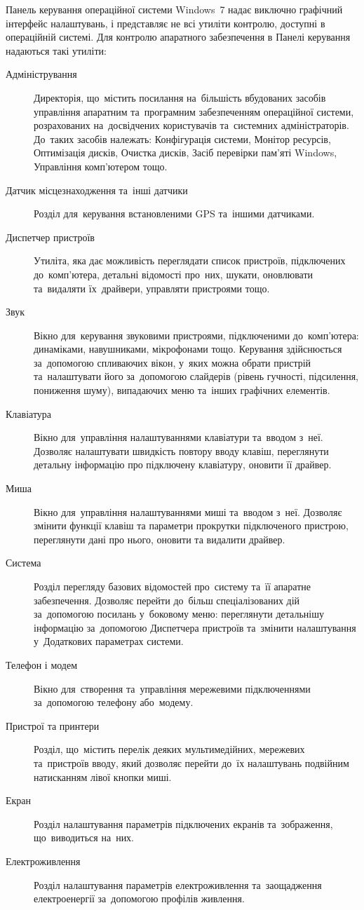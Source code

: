 \documentclass[
	a4paper,
	oneside,
	DIV = 12,
	BCOR = 10mm,
	12pt,
	headings = normal,
]{scrartcl}
\newcommand{\allcaps}[1]{{\addfontfeatures{LetterSpace = 5}#1}}
\begin{document}
			Панель керування операційної системи Windows~7 надає виключно графічний інтерфейс налаштувань, і представляє не всі утиліти контролю, доступні в операційній системі. Для контролю апаратного забезпечення в Панелі керування надаються такі утиліти:
			\begin{description}
				\item [Адміністрування] Директорія, що~містить посилання на~більшість вбудованих засобів управління апаратним та~програмним забезпеченням операційної системи, розрахованих на~досвідчених користувачів та~системних адміністраторів. До~таких засобів належать: Конфігурація системи, Монітор ресурсів, Оптимізація дисків, Очистка дисків, Засіб перевірки пам'\-я\-ті Windows, Управління комп'\-ю\-те\-ром тощо.
				\item [Датчик місцезнаходження та~інші датчики] Розділ для~керування встановленими \allcaps{GPS} та~іншими датчиками.
				\item [Диспетчер пристроїв] Утиліта, яка дає можливість переглядати список пристроїв, підключених до~ком\-п'\-ю\-те\-ра, детальні відомості про~них, шукати, оновлювати та~видаляти їх~драйвери, управляти пристроями тощо.
				\item [Звук] Вікно для~керування звуковими пристроями, підключеними до~ком\-п'\-ю\-те\-ра: динаміками, навушниками, мікрофонами тощо. Керування здійснюється за~допомогою спливаючих вікон, у~яких можна обрати пристрій та~налаштувати його за~допомогою слайдерів (рівень гучності, підсилення, пониження шуму), випадаючих меню та~інших графічних елементів.
				\item [Клавіатура] Вікно для~управління налаштуваннями клавіатури та~вводом з~неї. Дозволяє налаштувати швидкість повтору вводу клавіш, переглянути детальну інформацію про підключену клавіатуру, оновити її драйвер.
				\item [Миша] Вікно для~управління налаштуваннями миші та~вводом з~неї. Дозволяє змінити функції клавіш та параметри прокрутки підключеного пристрою, переглянути дані про нього, оновити та видалити драйвер.
				\item [Система] Розділ перегляду базових відомостей про~систему та~її апаратне забезпечення. Дозволяє перейти до~більш спеціалізованих дій за~допомогою посилань у~боковому меню: переглянути детальнішу інформацію за~допомогою Диспетчера пристроїв та~змінити налаштування у~Додаткових параметрах системи.
				\item [Телефон і модем] Вікно для~створення та~управління мережевими підключеннями за~допомогою телефону або~модему.
				\item [Пристрої та принтери] Розділ, що~містить перелік деяких мультимедійних, мережевих та~пристроїв вводу, який дозволяє перейти до~їх налаштувань подвійним натисканням лівої кнопки миші.
				\item [Екран] Розділ налаштування параметрів підключених екранів та~зображення, що~виводиться на~них. 
				\item [Електроживлення] Розділ налаштування параметрів електроживлення та~заощадження електроенергії за~допомогою профілів живлення.
			\end{description}
\end{document}
